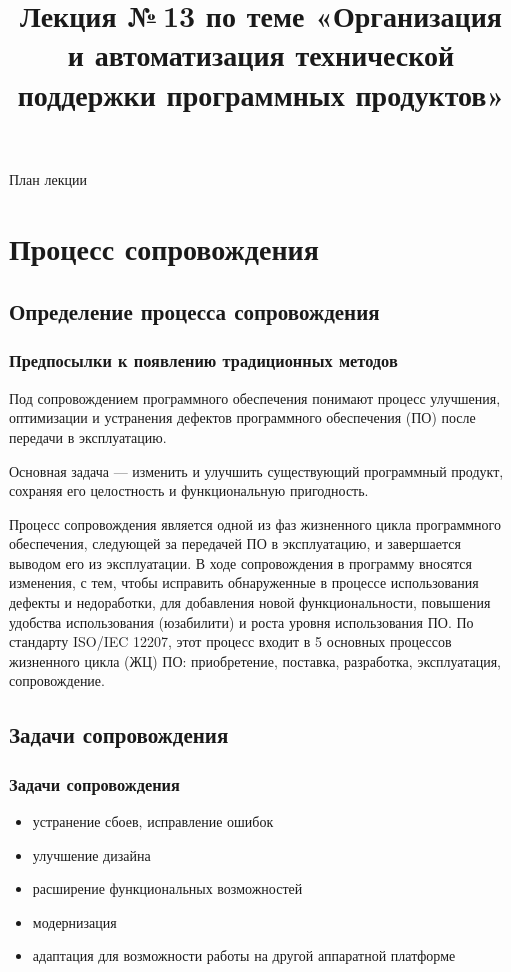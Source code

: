 \documentclass{../industrial-development}
\title{Лекция №\,13 по теме «Организация и автоматизация технической поддержки программных продуктов»}
\author{ }
\date{}
\begin{document}
\begin{frame}
  \titlepage
\end{frame}

\begin{frame}{План лекции}
  \tableofcontents
\end{frame}  

\section{Процесс сопровождения}
\subsection{Определение процесса сопровождения}


\begin{frame} \frametitle{Предпосылки к появлению традиционных методов}

	\begin{definition}
		\alert{Под сопровождением программного обеспечения} 
		 понимают процесс улучшения, оптимизации и устранения дефектов программного обеспечения (ПО) после передачи в эксплуатацию.
	\end{definition}
	
	Основная задача — изменить и улучшить существующий программный продукт, сохраняя его целостность и функциональную пригодность. 
	
\end{frame}

\lecturenotes
Процесс сопровождения является одной из фаз жизненного цикла программного обеспечения, следующей за передачей ПО в эксплуатацию, и завершается выводом его из эксплуатации. В ходе сопровождения в программу вносятся изменения, с тем, чтобы исправить обнаруженные в процессе использования дефекты и недоработки, для добавления новой функциональности, повышения удобства использования (юзабилити) и роста уровня использования ПО. По стандарту ISO/IEC 12207, этот процесс входит в 5 основных процессов жизненного цикла (ЖЦ) ПО: приобретение, поставка, разработка, эксплуатация, сопровождение. 


\subsection{Задачи сопровождения}
\begin{frame} \frametitle{Задачи сопровождения}
	\begin{itemize}
		\item устранение сбоев, исправление ошибок
		\item улучшение дизайна 
		\item расширение функциональных возможностей 
		\item модернизация
		\item адаптация для возможности работы на другой аппаратной платформе
	\end{itemize}
\end{frame}
\end{document}
